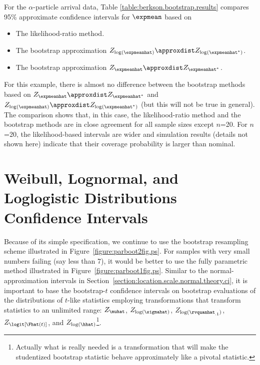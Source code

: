 For the $\alpha$-particle arrival data, Table
\ref{table:berkson.bootstrap.results} compares 95\% approximate
confidence intervals for $\expmean$ based on
\begin{itemize}
\item
The likelihood-ratio method. 
\item
The bootstrap approximation 
$Z_{\log(\expmeanhat)} \approxdist Z_{\log(\expmeanhat^{*})}$.
\item
The bootstrap approximation 
$Z_{\expmeanhat} \approxdist Z_{\expmeanhat^{*}}$.
\end{itemize}

For this example, there is almost no
difference between the bootstrap methods based on $Z_{\expmeanhat}
\approxdist Z_{\expmeanhat^{*}}$ and $Z_{\log(\expmeanhat)}
\approxdist Z_{\log(\expmeanhat^{*})}$ 
(but this will not be true in general). 
The comparison shows that, in this case, the likelihood-ratio method
and the bootstrap methods are in close agreement for all sample
sizes except
$n$=20.  For $n$=20, the likelihood-based intervals are wider and
simulation results (details not shown here) indicate that their coverage
probability is larger than nominal.


\section{Weibull, Lognormal,
and Loglogistic Distributions Confidence Intervals}
\label{section:ls.bootstrap}
Because of its simple specification, we continue to use the
bootstrap resampling scheme illustrated in
Figure~\ref{figure:parboot2fig.ps}. For samples with very small
numbers failing (say less than 7), it would be better to use the fully
parametric method illustrated in Figure~\ref{figure:parboot1fig.ps}.
Similar to the normal-approximation intervals in
Section~\ref{section:location.scale.normal.theory.ci}, it is important
to base the bootstrap-$t$ confidence intervals on bootstrap evaluations
of the distributions of $t$-like statistics employing transformations
that transform statistics to an unlimited range:
$Z_{\muhat}$,
$Z_{\log(\sigmahat)}$, $Z_{\log(\rvquanhat_{.1})}$,
$Z_{\logit[\Fhat(t)]}$, and $Z_{\log(\hhat)}$\footnote{Actually
what is really needed is a transformation that will make the studentized
bootstrap statistic behave approximately like a pivotal statistic.}.

